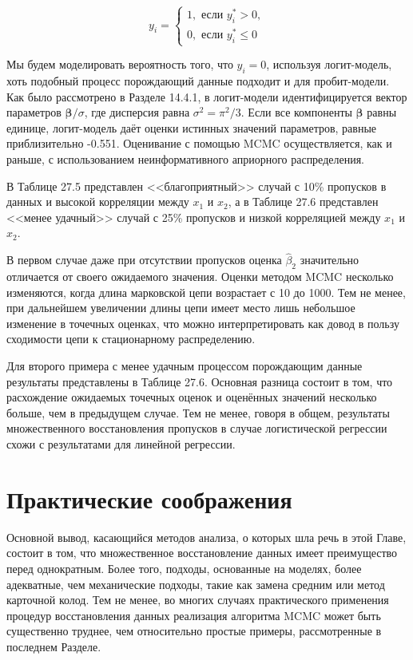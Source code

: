 \begin{equation}
y_i=
\begin{cases}
1, \text{ если } y_i^*>0, \\
0, \text{ если } y_i^*\leqslant 0
\end{cases}
\end{equation}



Мы будем моделировать вероятность того, что $y_i=0$, используя логит-модель, хоть подобный процесс порождающий данные подходит и для пробит-модели. Как было рассмотрено в Разделе 14.4.1, в логит-модели идентифицируется вектор параметров $\mathbf{\beta}/\sigma$, где дисперсия равна $\sigma^2=\pi^2/3$. Если все компоненты $\mathbf{\beta}$ равны единице, логит-модель даёт оценки истинных значений параметров, равные приблизительно -0.551. Оценивание с помощью MCMC осуществляется, как и раньше, с использованием неинформативного априорного распределения.

В Таблице 27.5 представлен <<благоприятный>> случай с 10\% пропусков в данных и высокой корреляции между $x_1$ и $x_2$, а в Таблице 27.6 представлен <<менее удачный>> случай с 25\% пропусков и низкой корреляцией между $x_1$ и $x_2$.

В первом случае даже при отсутствии пропусков оценка $\widehat{\beta}_2$ значительно отличается от своего ожидаемого значения. Оценки методом MCMC несколько изменяются, когда длина марковской цепи возрастает с 10 до 1000. Тем не менее, при дальнейшем увеличении длины цепи имеет место лишь небольшое изменение в точечных оценках, что можно интерпретировать как довод в пользу сходимости цепи к стационарному распределению.

Для второго примера с менее удачным процессом порождающим данные результаты представлены в Таблице 27.6. Основная разница состоит в том, что расхождение ожидаемых точечных оценок и оценённых значений несколько больше, чем в предыдущем случае. Тем не менее, говоря в общем, результаты множественного восстановления пропусков в случае логистической регрессии схожи с результатами для линейной регрессии.



\section{Практические соображения}

Основной вывод, касающийся методов анализа, о которых шла речь в этой Главе, состоит в том, что множественное восстановление данных имеет преимущество перед однократным. Более того, подходы, основанные на моделях, более адекватные, чем механические подходы, такие как замена средним или метод карточной колод. Тем не менее, во многих случаях практического применения процедур восстановления данных  реализация алгоритма MCMC может быть существенно труднее, чем относительно простые примеры, рассмотренные в последнем Разделе.

